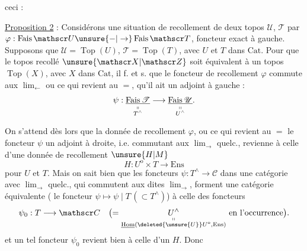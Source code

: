  ceci :

\uline{Proposition 2} : Considérons une situation de recollement
de deux topos $\mathscr U$, $\mathscr T$ par $\varphi:\operatorname{Fais}\mathscr U\unsure{-|\to}\operatorname{Fais}\mathscr T$,
foncteur exact à gauche. Supposons que $\mathscr U=\operatorname{Top}(U)$,
$\mathscr T=\operatorname{Top}(T)$, avec $U$ et $T$ dans $\mathrm{Cat}$. Pour que
le topos recollé $\unsure{\mathscr X|\mathscr Z}$ soit équivalent à un topos
$\operatorname{Top}(X)$, avec $X$ dans $\mathrm{Cat}$, il f. et s. que
le foncteur de recollement $\varphi$ commute aux
$\lim_{\leftarrow}$  ou ce qui revient au $=$,
qu'il ait un adjoint à gauche :
\[
\psi:\underset{\substack{\shortparallel\\T^\wedge}}{\underline{\operatorname{Fais}\mathscr T}}
\longrightarrow\underset{\substack{\shortparallel\\U^\wedge}}{\underline{\operatorname{Fais}\mathscr U}} .
\]

On s'attend dès lors que  la donnée de
recollement $\varphi$, ou ce qui revient au $=$ le
foncteur $\psi$  un adjoint à droite, i.e.
commutant aux $\lim_{\rightarrow}$ quelc., revienne à
celle d'une donnée de recollement $\unsure{H|M}$
\[
H:U^{\mathrm o}\times T\longrightarrow\mathrm{Ens}
\]
pour $U$ et $T$. Mais on sait bien que
les foncteurs $\psi:T^\wedge\longrightarrow\mathscr C$ dans une
catégorie  avec $\lim_{\rightarrow}$ quelc., qui commutent
aux dites $\lim_{\rightarrow}$, forment une catégorie
équivalente ( le foncteur $\psi\longmapsto\psi\mid T\,(\subset T^\wedge)$)
à celle des  foncteurs
\[
\psi_0:T\longrightarrow\mathscr C
\quad \bigl(=\underset{\substack{\shortparallel\\\underline{\operatorname{Hom}}(\deleted{\unsure{U}}U^{\mathrm o},\mathrm{Ens})}}{U^\wedge}
\text{ en l'occurrence}\bigr).
\]
et un tel foncteur $\psi_0$ revient bien à celle d'un
$H$. Donc

